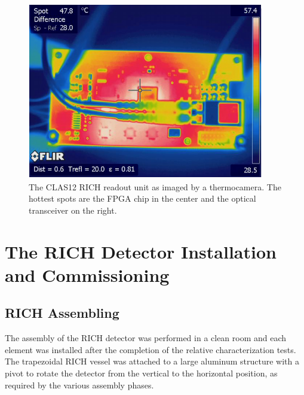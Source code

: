\documentclass[5p,times,twocolumn]{elsarticle}
\begin{document}
\begin{figure}[t]
\begin{center}
\includegraphics[width=0.90\columnwidth]{FPGA_heat.pdf}
\end{center}
\caption{The CLAS12 RICH readout unit as imaged by a thermocamera. The hottest spots are the FPGA chip in the
  center and the optical transceiver on the right.}
\label{Fig:EleTile}
\end{figure}

\section{The RICH Detector Installation and Commissioning}

\subsection{RICH Assembling}


The assembly of the RICH detector was performed in a clean room and each element was installed after the completion
of the relative characterization tests. The trapezoidal RICH vessel was attached to a large aluminum structure with a
pivot to rotate the detector from the vertical to the horizontal position, as required by the various assembly phases.
\end{document}
